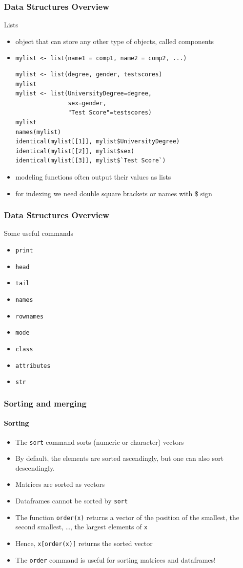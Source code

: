 \documentclass[xcolor={svgnames},10pt,
handout
]{beamer}
\begin{document}
\begin{frame}[fragile]\frametitle{Data Structures Overview}\footnotesize
Lists
\begin{itemize}
\item object that can store any other type of objects, called components
\item \texttt{mylist <- list(name1 = comp1, name2 = comp2, ...)}
\begin{lstlisting}
mylist <- list(degree, gender, testscores)
mylist
mylist <- list(UniversityDegree=degree,
			   sex=gender,
			   "Test Score"=testscores)
mylist
names(mylist)
identical(mylist[[1]], mylist$UniversityDegree)
identical(mylist[[2]], mylist$sex)
identical(mylist[[3]], mylist$`Test Score`)
\end{lstlisting}
\item modeling functions often output their values as lists
\item for indexing we need double square brackets or names with \$ sign
\end{itemize}
\end{frame}

\begin{frame}\frametitle{Data Structures Overview}
Some useful commands
\begin{itemize}
\item \lstinline|print|
\item \lstinline|head|
\item \lstinline|tail|
\item \lstinline|names|
\item \lstinline|rownames|
\item \lstinline|mode|
\item \lstinline|class|
\item \lstinline|attributes|
\item \lstinline|str|
\end{itemize}

\end{frame}


\begin{frame}[fragile]
\frametitle{Sorting and merging}
\framesubtitle{Sorting}
\begin{itemize}
	\item The \lstinline|sort| command sorts (numeric or character) vectors
	\item By default, the elements are sorted ascendingly, but one can also sort descendingly.
	\item Matrices are sorted as vectors
	\item Dataframes cannot be sorted by \lstinline|sort|
	\item The function \lstinline|order(x)| returns a vector of the position of the smallest, the second smallest, \ldots , the largest elements of \lstinline|x|
	\item Hence, \lstinline|x[order(x)]| returns the sorted vector
	\item The \lstinline|order| command is useful for sorting matrices and dataframes!
\end{itemize}
\end{frame}
\end{document}
